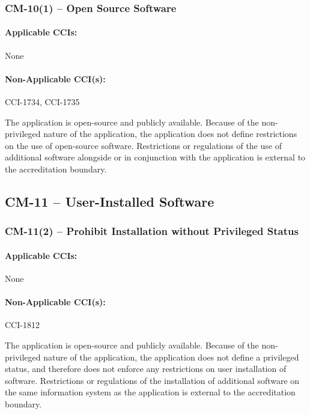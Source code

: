\documentclass[letterpaper, 10pt, twoside]{article}
\begin{document}
\subsubsection{CM-10(1) -- Open Source Software}

\paragraph{Applicable CCIs:} None

\paragraph{Non-Applicable CCI(s):} CCI-1734, CCI-1735

The application is open-source and publicly available. Because of the non-privileged nature of the application, the application does not define restrictions on the use of open-source software. Restrictions or regulations of the use of additional software alongside or in conjunction with the application is external to the accreditation boundary.

\subsection{CM-11 -- User-Installed Software}

\subsubsection{CM-11(2) -- Prohibit Installation without Privileged Status}

\paragraph{Applicable CCIs:} None

\paragraph{Non-Applicable CCI(s):} CCI-1812

The application is open-source and publicly available. Because of the non-privileged nature of the application, the application does not define a privileged status, and therefore does not enforce any restrictions on user installation of software. Restrictions or regulations of the installation of additional software on the same information system as the application is external to the accreditation boundary.

\clearpage
\printbibliography
\end{document}
